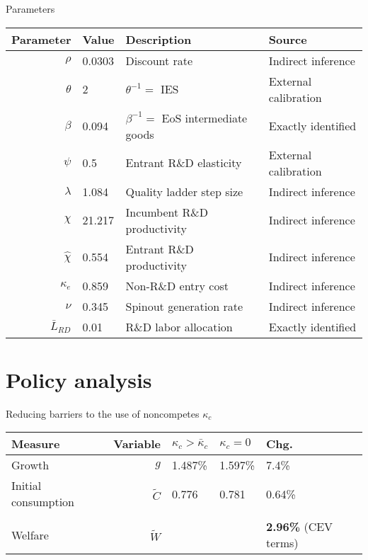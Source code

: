 \documentclass[english,usenames,dvipsnames,handout]{beamer}
\begin{document}
\begin{frame}{Parameters}\label{parameters}
\begin{table}[]
	\footnotesize
	\centering
	\label{calibration_parameters}
	\begin{tabular}{rlll}
		\toprule \toprule
		Parameter & Value & Description & Source \tabularnewline
		\midrule
		$\rho$ & 0.0303 & Discount rate  & Indirect inference \tabularnewline
		$\theta$ & 2 & $\theta^{-1} = $ IES & External calibration 
		\tabularnewline
		$\beta$ & 0.094 & $\beta^{-1} = $ EoS intermediate goods & Exactly identified \tabularnewline 
		$\psi$ & 0.5 & Entrant R\&D elasticity & External calibration \tabularnewline
		$\lambda$ & 1.084 & Quality ladder step size & Indirect inference 
		\tabularnewline
		$\chi$ & 21.217 & Incumbent R\&D productivity & Indirect inference 
		\tabularnewline
		$\hat{\chi}$ & 0.554 & Entrant R\&D productivity & Indirect inference \tabularnewline 
		$\kappa_e$ & 0.859 & Non-R\&D entry cost & Indirect inference \tabularnewline
		$\nu$ & 0.345 & Spinout generation rate  & Indirect inference\tabularnewline
		$\bar{L}_{RD}$ & 0.01 & R\&D labor allocation  & Exactly identified \tabularnewline
		\bottomrule
	\end{tabular}
\end{table}
\end{frame}

\section{Policy analysis}

\begin{frame}
\tableofcontents[currentsection]
\end{frame}

\begin{frame}{Reducing barriers to the use of noncompetes $\kappa_c$}\label{reducing_kappa_c_table}
	\begin{table}
		\centering
		\small
		\begin{tabular}{lrlll}
			\toprule \toprule
			Measure & Variable & $\kappa_c > \bar{\kappa}_c$ & $\kappa_c = 0$ & Chg. \tabularnewline
			\midrule
			Growth & $g$ & 1.487\% & 1.597\% & 7.4\% \tabularnewline
			Initial consumption & $\tilde{C}$  & 0.776 &  0.781 & 0.64\% \tabularnewline 
			\tabularnewline
			Welfare & $\tilde{W}$  &  & & \alert{\textbf{2.96\%}} (CEV terms)  \tabularnewline
			\bottomrule
		\end{tabular}
	\end{table}
	\hyperlink{decomposition_growth_increase}{}
	\hyperlink{reducing_kappa_c}{}
	\hyperlink{robustness_to_moments}{} \hyperlink{robustness_to_parameters}{}
\end{frame}
\end{document}
